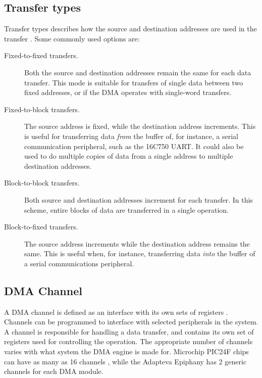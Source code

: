 \subsection{Transfer types}
Transfer types describes how the source and destination addresses are used in the transfer \cite{microchip54}.
Some commonly used options are:
\begin{description}
    \item[Fixed-to-fixed transfers.]
    Both the source and destination addresses remain the same for each data transfer.
    This mode is suitable for transfers of single data between two fixed addresses,
    or if the DMA operates with single-word transfers.
    \item[Fixed-to-block transfers.]
    The source address is fixed, while the destination address increments.
    This is useful for transferring data \emph{from} the buffer of, for instance, a serial
    communication peripheral, such as the 16C750 UART.
    It could also be used to do multiple copies of data from a single address to multiple destination addresses.
    \item[Block-to-block transfers.]
    Both source and destination addresses increment for each transfer.
    In this scheme, entire blocks of data are transferred in a single operation.
    \item[Block-to-fixed transfers.]
    The source address increments while the destination address remains the same.
    This is useful when, for instance, transferring data \emph{into} the buffer of a
    serial communications peripheral.
\end{description}


\subsection{DMA Channel}
A DMA channel is defined as an interface with its own sets of registers \cite{DMAOxford}.
Channels can be programmed to interface with selected peripherals in the system.
A channel is responsible for handling a data transfer, and contains its own set of registers used for controlling the operation.
The appropriate number of channels varies with what system the DMA engine is made for.
Microchip PIC24F chips can have as many as 16 channels \cite{microchip54}, while the Adapteva Epiphany \cite{epiphany} has 2 generic channels for each DMA module.

